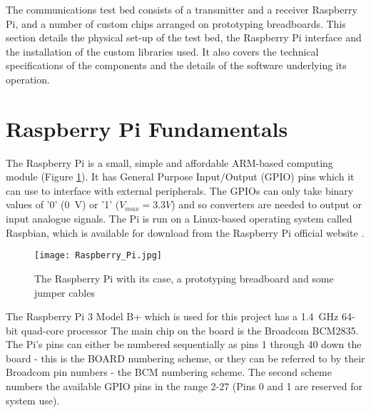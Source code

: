 \documentclass[../main.tex]{subfiles}
\begin{document}
The communications test bed consists of a transmitter and a receiver Raspberry Pi, and a number of custom chips arranged on prototyping breadboards.
This section details the physical set-up of the test bed, the Raspberry Pi interface and the installation of the custom libraries used.
It also covers the technical specifications of the components and the details of the software underlying its operation.


\section{Raspberry Pi Fundamentals}

The Raspberry Pi is a small, simple and affordable ARM-based computing module (Figure \ref{fig_Raspberry Pi}).
It has General Purpose Input/Output (GPIO) pins which it can use to interface with external peripherals.
The GPIOs can only take binary values of '0' (\SI{0}{\volt}) or '1' ($V_{max} = 3.3V$) and so converters are needed to output or input analogue signals.
The Pi is run on a Linux-based operating system called Raspbian, which is available for download from the Raspberry Pi official website
\cite{lib_Raspbian}.\\

\begin{figure}[ht]
	\centering
	\texttt{[image: Raspberry\_Pi.jpg]}
	\caption{The Raspberry Pi with its case, a prototyping breadboard and some jumper cables}
	\label{fig_Raspberry Pi}
\end{figure}

The Raspberry Pi 3 Model B+ which is used for this project has a \SI{1.4}{\giga\hertz} 64-bit quad-core processor
The main chip on the board is the Broadcom BCM2835.
The Pi's pins can either be numbered sequentially as pins 1 through 40 down the board - this is the BOARD numbering scheme, or they can be referred to by their Broadcom pin numbers - the BCM numbering scheme.
The second scheme numbers the available GPIO pins in the range 2-27 (Pins 0 and 1 are reserved for system use).
\end{document}
